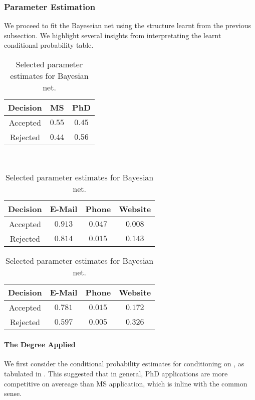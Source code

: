 	\subsubsection{Parameter Estimation}

		We proceed to fit the Bayeseian net using the structure learnt from the previous subsection.
		We highlight several insights from interpretating the learnt conditional
		probability table.

	\begin{table}[htpb]
	    \centering
	    \begin{subtable}{0.2\textwidth}\centering
	    \begin{tabular}{|c|c|c|}
		\hline
			Decision & MS & PhD \\\hline
			Accepted & $0.55$ & $0.45$ \\\hline
			Rejected & $0.44$ & $0.56$ \\\hline
	    \end{tabular}
			\caption{} \label{table:bn:1}
	    \end{subtable} \\
	    \begin{subtable}{0.4\textwidth}\centering
	    \begin{tabular}{|c|c|c|c|}
		\hline
			Decision & E-Mail & Phone & Website \\\hline
			Accepted & $0.913$ & $0.047$ & $0.008$ \\\hline
			Rejected & $0.814$ & $0.015$ & $0.143$ \\\hline
	    \end{tabular}
			\caption{} \label{table:bn:2}
	    \end{subtable}%
	    \begin{subtable}{0.4\textwidth}\centering
	    \begin{tabular}{|c|c|c|c|}
		\hline
			Decision & E-Mail & Phone & Website \\\hline
			Accepted & $0.781$ & $0.015$ & $0.172$ \\\hline
			Rejected & $0.597$ & $0.005$ & $0.326$ \\\hline
	    \end{tabular}
			\caption{} \label{table:bn:3}
	    \end{subtable}%
	    \caption{Selected parameter estimates for Bayesian net.}
	    \label{table:bn}
	\end{table}

		\paragraph{The Degree Applied}
			We first consider the conditional probability estimates
			for  conditioning on , as tabulated
			in . This suggested that in general, PhD applications
			are more competitive on avereage than MS application, which is
			inline with the common sense.

